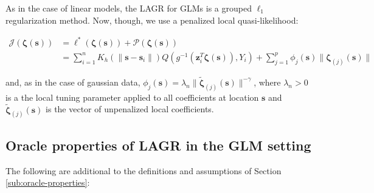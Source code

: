 \documentclass[12pt,english,authoryear, review]{article}\usepackage[]{graphicx}\usepackage[]{color}
\theoremstyle{plain}
\theoremstyle{plain}
\begin{document}
As in the case of linear models, the LAGR for GLMs is a grouped $\ell_{1}$
regularization method. Now, though, we use a penalized local quasi-likelihood:

\begin{align}
\mathcal{J}\left(\bm{\zeta}(\bm{s})\right) & =\mathcal{\ell}^{*}\left(\bm{\zeta}(\bm{s})\right)+\mathcal{P}\left(\bm{\zeta}(\bm{s})\right)\label{eq:adaptive-lasso-GLLM}\\
 & =\sum_{i=1}^{n}K_{h}\left(\|\bm{s}-\bm{s}_{i}\|\right)Q\left(g^{-1}\left(\bm{z}_{i}^{T}\bm{\zeta}(\bm{s})\right),Y_{i}\right)+\sum_{j=1}^{p}\phi_{j}\left(\bm{s}\right)\|\bm{\zeta}_{\left(j\right)}\left(\bm{s}\right)\|
\end{align}


and, as in the case of gaussian data, $\phi_{j}\left(\bm{s}\right)=\lambda_{n}\|\tilde{\bm{\zeta}}_{\left(j\right)}\left(\bm{s}\right)\|^{-\gamma}$,
where $\lambda_{n}>0$ is a the local tuning parameter applied to
all coefficients at location $\bm{s}$ and $\tilde{\bm{\zeta}}_{\left(j\right)}\left(\bm{s}\right)$
is the vector of unpenalized local coefficients.


\subsection{Oracle properties of LAGR in the GLM setting}

The following are additional to the definitions and assumptions of
Section \ref{sub:oracle-properties}:
\end{document}
